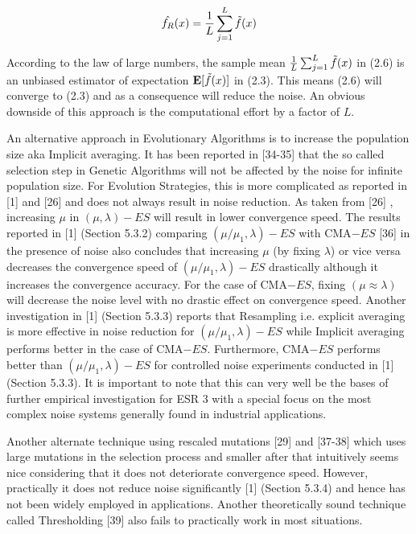 \begin{equation}
\hat{f_{R}}(x) = \frac{1}{L}  \sum_{j=1}^{L}  \Tilde{f}(x)
\end{equation}

According to the law of large numbers, the sample mean   $ \frac{1}{L}  \sum_{j=1}^{L}  \Tilde{f}(x) $ in (2.6) is an unbiased estimator of expectation $ \textbf{E}[\Tilde{f}(x)] $ in (2.3). This means (2.6) will converge to (2.3) and as a consequence will reduce the noise. An obvious downside of this approach is the computational effort by a factor of $L$. 

An alternative approach in Evolutionary Algorithms is to increase the population size aka Implicit averaging. It has been reported in [34-35] that the so called selection step in Genetic Algorithms will not be affected by the noise for infinite population size. For Evolution Strategies, this is more complicated as reported in [1] and [26] and does not always result in noise reduction. As taken from [26] , increasing $\mu$ in $(\mu,\lambda)-ES$ will result in lower convergence speed. The results reported in [1] (Section 5.3.2) comparing $ (\mu / \mu_{1},\lambda)-ES$ with CMA$-ES$ [36] in the presence of noise also concludes that increasing $\mu$ (by fixing $\lambda$) or vice versa decreases the convergence speed of $ (\mu / \mu_{1},\lambda)-ES$ drastically although it increases the convergence accuracy. For the case of CMA$-ES$, fixing $(\mu \approx \lambda)$ will decrease the noise level with no drastic effect on convergence speed. Another investigation in [1] (Section 5.3.3) reports that Resampling i.e. explicit averaging is more effective in noise reduction for $ (\mu / \mu_{1},\lambda)-ES$ while Implicit averaging performs better in the case of CMA$-ES$. Furthermore, CMA$-ES$ performs better than  $ (\mu / \mu_{1},\lambda)-ES$ for controlled noise experiments conducted in [1] (Section 5.3.3). It is important to note that this can very well be the bases of further empirical investigation for ESR 3 with a special focus on the most complex noise systems generally found in industrial applications. 

Another alternate technique using rescaled mutations [29] and [37-38] which uses large mutations in the selection process and smaller after that intuitively seems nice considering that it does not deteriorate convergence speed. However, practically it does not reduce noise significantly [1] (Section 5.3.4) and hence has not been widely employed in applications. Another theoretically sound technique called Thresholding [39] also fails to practically work in most situations.

